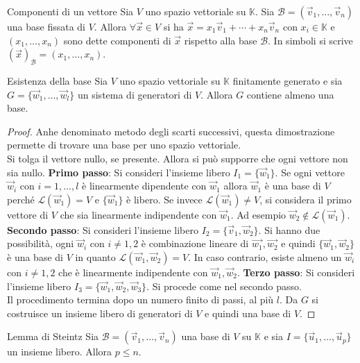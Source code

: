 \begin{Def}{Componenti di un vettore}
  Sia $V$ uno spazio vettoriale su $\mathbb{K}$. Sia $\mathscr{B}=(\vec{v}_1,\ldots,
  \vec{v}_n)$ una base fissata di $V$. Allora $\forall \vec{x}\in V$ si ha
  $\vec{x}=x_1\vec{v}_1+\cdots+x_n\vec{v}_n$ con $x_i\in\mathbb{K}$ e $(x_1,\ldots,x_n)$
  sono dette componenti di $\vec{x}$ rispetto alla base $\mathscr{B}$. In simboli si
  scrive ${(\vec{x})}_\mathscr{B}=(x_1,\ldots,x_n)$.
\end{Def}

\begin{Thm}{Esistenza della base}
  Sia $V$ uno spazio vettoriale su $\mathbb{K}$ finitamente generato e sia
  $G=\{\vec{w}_1,\ldots,\vec{w}_l\}$ un sistema di generatori di $V$. Allora $G$
  contiene almeno una base.
\end{Thm}

\begin{proof}
  Anhe denominato metodo degli scarti successivi, questa dimostrazione permette di
  trovare una base per uno spazio vettoriale.\\
  Si tolga il vettore nullo, se presente. Allora si può supporre che ogni vettore non
  sia nullo. \textbf{Primo passo}: Si consideri l'insieme libero $I_1=\{\vec{w}_1\}$. Se
  ogni vettore $\vec{w}_i$ con $i=1,\ldots,l$ è linearmente dipendente con $\vec{w}_1$
  allora $\vec{w}_1$ è una base di $V$ perché $\mathscr{L}(\vec{w}_1)=V$ e $\{\vec{w}_1\}$
  è libero. Se invece $\mathscr{L}(\vec{w}_1)\neq V$, si considera il primo vettore di
  $V$ che sia linearmente indipendente con $\vec{w}_1$. Ad esempio
  $\vec{w}_2\notin\mathscr{L}(\vec{w}_1)$. \textbf{Secondo passo}: Si consideri
  l'insieme libero $I_2=\{\vec{v}_1,\vec{w}_2\}$. Si hanno due possibilità, ogni
  $\vec{w}_i$ con $i\neq1,2$ è combinazione lineare di $\vec{w_1},\vec{w_2}$ e quindi
  $\{\vec{w}_1,\vec{w}_2\}$ è una base di $V$ in quanto
  $\mathscr{L}(\vec{w}_1,\vec{w}_2)=V$. In caso contrario, esiste almeno un $\vec{w}_i$
  con $i\neq1,2$ che è linearmente indipendente con $\vec{w}_1,\vec{w}_2$. \textbf{Terzo
  passo}: Si consideri l'insieme libero $I_3=\{\vec{w}_1,\vec{w}_2,\vec{w}_3\}$. Si
  procede come nel secondo passo.\\
  Il procedimento termina dopo un numero finito di passi, al più $l$. Da $G$ si
  costruisce un insieme libero di generatori di $V$ e quindi una base di $V$.
\end{proof}

\begin{Thm}{Lemma di Steintz}\label{thm:lemma_steintz}
  Sia $\mathscr{B}=(\vec{v}_1,\ldots,\vec{v}_n)$ una base di $V$ su $\mathbb{K}$ e sia
  $I=\{\vec{u}_1,\ldots,\vec{u}_p\}$ un insieme libero. Allora $p\leq n$.
\end{Thm}

